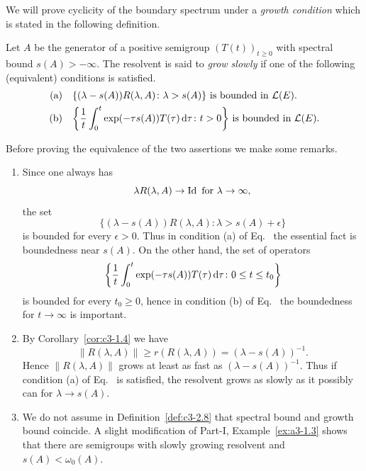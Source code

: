We will prove cyclicity of the boundary spectrum under a \emph{growth condition}%
which is stated in the following definition.
\begin{definition}\label{def:c3-2.8}
	Let $A$ be the generator of a positive semigroup $(T(t))_{t \geq 0}$ with spectral bound $s(A) > -\infty$.
	The resolvent is said to \emph{grow slowly} if one of the following (equivalent) conditions is satisfied.
	\begin{equation}\label{eq:c3-2.15}
	\begin{split}
	\text{(a)}\quad & \text{$\{(\lambda-s(A))R(\lambda,A) \colon \lambda > s(A)\}$ is bounded in $\mathcal{L}(E)$} .\\
	\text{(b)}\quad & \text{$\left\{\frac{1}{t} \int_{0}^{t} \exp(-\tau s(A))T(\tau) \mathop{}\!\mathrm{d}{\tau} \colon t > 0\right\}$ is bounded in $\mathcal{L}(E)$} .
	\end{split}
	\end{equation}
\end{definition}
Before proving the equivalence of the two assertions we make some remarks.
\begin{remarks*}
\begin{enumerate}[\upshape (i), wide, labelindent=0.5em]
    \item 
    Since one always has 
\[
	\lambda R(\lambda,A) \to \operatorname{Id} \text{ for $\lambda \to \infty$,}
\]
%
the set 
%
\[
	\{(\lambda-s(A))R(\lambda,A) \colon \lambda > s(A)+\epsilon\}
\]
%
is bounded for every $\epsilon > 0$. 
Thus in condition (a) of Eq.~ the essential fact is boundedness near $s(A)$. 
    On the other hand, the set of operators 
\[
	\mleft\{ \frac{1}{t} \int_{0}^{t} \exp(-\tau s(A))T(\tau) \diff{\tau} \colon 0 \leq t \leq t_{0} \mright\}
\]
%
is bounded for every $t_{0} \geq 0$, hence in condition (b) of Eq.~ the boundedness for $t \to \infty$ is important.

    \item 
    By Corollary~\ref{cor:c3-1.4} we have 
\[
	\|R(\lambda,A)\| \geq r(R(\lambda,A)) = (\lambda-s(A))^{-1} .
\]
%
Hence $\|R(\lambda,A)\|$ grows at least as fast as $(\lambda-s(A))^{-1}$. 
    Thus if condition (a) of Eq.~ is satisfied, the resolvent grows as slowly as it possibly can for $\lambda \to s(A)$.

    \item 
    We do not assume in Definition~\ref{def:c3-2.8} that spectral bound and growth bound coincide.
    A slight modification of Part-I, Example~\ref{ex:a3-1.3} shows that there are semigroups with slowly growing resolvent and $s(A) < \omega_0(A)$.
\end{enumerate}
\end{remarks*}
